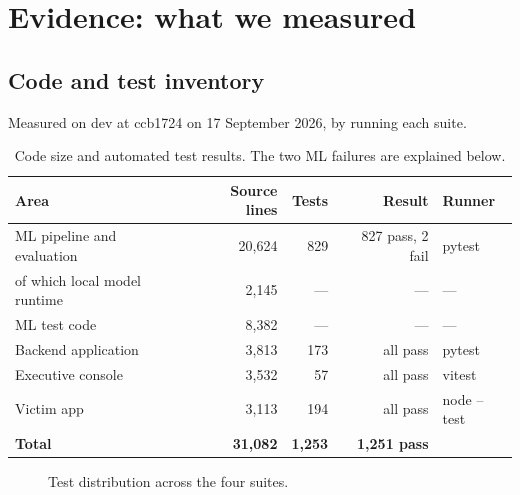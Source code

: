 \documentclass[11pt,a4paper]{article}
\newcommand{\codeus}{\textunderscore\allowbreak}
\DeclareRobustCommand{\code}[1]{{\ttfamily\let\_\codeus #1}}
\begin{document}
\section{Evidence: what we measured}
\label{sec:evidence}

\subsection{Code and test inventory}
\label{sec:tests}
Measured on \code{dev} at \code{ccb1724} on 17 September 2026, by running each suite.

\begin{table}[!htbp]
\centering\small
\caption{Code size and automated test results. The two ML failures are explained below.}
\label{tab:tests}
\begin{tabular}{@{}lrrrl@{}}
\toprule
Area & Source lines & Tests & Result & Runner \\
\midrule
ML pipeline and evaluation & 20{,}624 & 829 & 827 pass, 2 fail & pytest \\
\quad of which local model runtime & 2{,}145 & --- & --- & --- \\
ML test code & 8{,}382 & --- & --- & --- \\
Backend application & 3{,}813 & 173 & all pass & pytest \\
Executive console & 3{,}532 & 57 & all pass & vitest \\
Victim app & 3{,}113 & 194 & all pass & node --test \\
\midrule
\textbf{Total} & \textbf{31{,}082} & \textbf{1{,}253} & \textbf{1{,}251 pass} & \\
\bottomrule
\end{tabular}
\end{table}

\begin{figure}[!htbp]
\centering
{}
\caption{Test distribution across the four suites.}
\label{fig:tests}
\end{figure}
\end{document}
